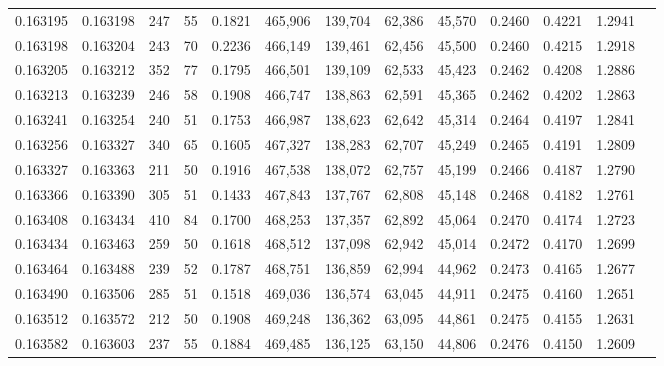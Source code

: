 \begin{tabular}{rrrrrrrrrrrrr}
0.163195 & 0.163198 &   247 &  55 &                                     0.1821 & 465,906 & 139,704 &  62,386 &  45,570 & 0.2460 & 0.4221 & 1.2941 \\
0.163198 & 0.163204 &   243 &  70 &                                     0.2236 & 466,149 & 139,461 &  62,456 &  45,500 & 0.2460 & 0.4215 & 1.2918 \\
0.163205 & 0.163212 &   352 &  77 &                                     0.1795 & 466,501 & 139,109 &  62,533 &  45,423 & 0.2462 & 0.4208 & 1.2886 \\
0.163213 & 0.163239 &   246 &  58 &                                     0.1908 & 466,747 & 138,863 &  62,591 &  45,365 & 0.2462 & 0.4202 & 1.2863 \\
0.163241 & 0.163254 &   240 &  51 &                                     0.1753 & 466,987 & 138,623 &  62,642 &  45,314 & 0.2464 & 0.4197 & 1.2841 \\
0.163256 & 0.163327 &   340 &  65 &                                     0.1605 & 467,327 & 138,283 &  62,707 &  45,249 & 0.2465 & 0.4191 & 1.2809 \\
0.163327 & 0.163363 &   211 &  50 &                                     0.1916 & 467,538 & 138,072 &  62,757 &  45,199 & 0.2466 & 0.4187 & 1.2790 \\
0.163366 & 0.163390 &   305 &  51 &                                     0.1433 & 467,843 & 137,767 &  62,808 &  45,148 & 0.2468 & 0.4182 & 1.2761 \\
0.163408 & 0.163434 &   410 &  84 &                                     0.1700 & 468,253 & 137,357 &  62,892 &  45,064 & 0.2470 & 0.4174 & 1.2723 \\
0.163434 & 0.163463 &   259 &  50 &                                     0.1618 & 468,512 & 137,098 &  62,942 &  45,014 & 0.2472 & 0.4170 & 1.2699 \\
0.163464 & 0.163488 &   239 &  52 &                                     0.1787 & 468,751 & 136,859 &  62,994 &  44,962 & 0.2473 & 0.4165 & 1.2677 \\
0.163490 & 0.163506 &   285 &  51 &                                     0.1518 & 469,036 & 136,574 &  63,045 &  44,911 & 0.2475 & 0.4160 & 1.2651 \\
0.163512 & 0.163572 &   212 &  50 &                                     0.1908 & 469,248 & 136,362 &  63,095 &  44,861 & 0.2475 & 0.4155 & 1.2631 \\
0.163582 & 0.163603 &   237 &  55 &                                     0.1884 & 469,485 & 136,125 &  63,150 &  44,806 & 0.2476 & 0.4150 & 1.2609 \\

\end{tabular}
